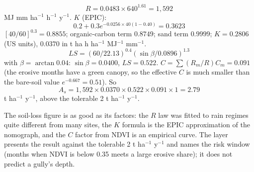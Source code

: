 \sol {}\ans \[R=0.0483\times640^{1.61}=1{,}592\] MJ mm ha$^{-1}$ h$^{-1}$ y$^{-1}$. $K$ (EPIC): \[0.2+0.3e^{-0.0256\times40(1-0.40)}=0.3623\]
$[40/60]^{0.3}=0.8855$; organic-carbon term $0.8749$; sand term $0.9999$; $K=0.2806$ (US units), $0.0370$ in t ha h ha$^{-1}$ MJ$^{-1}$ mm$^{-1}$. \[LS=(60/22.13)^{0.4}(\sin\beta/0.0896)^{1.3}\] with $\beta=\arctan0.04$: $\sin\beta=0.0400$, $LS=0.522$. $C=\sum(R_m/R)C_m=0.091$ (the erosive months have a green canopy, so the effective $C$ is much smaller than the bare-soil value $e^{-0.667}=0.51$). So \[A_s=1{,}592\times0.0370\times0.522\times0.091\times1=2.79\] t ha$^{-1}$ y$^{-1}$, above the tolerable 2 t ha$^{-1}$ y$^{-1}$. \finans


\begin{keybox}The soil-loss figure is as good as its factors: the $R$ law was fitted to rain regimes quite different from many sites, the $K$ formula is the EPIC approximation of the nomograph, and the $C$ factor from NDVI is an empirical curve. The layer presents the result against the tolerable 2 t ha$^{-1}$ y$^{-1}$ and names the risk window (months when NDVI is below 0.35 meets a large erosive share); it does not predict a gully's depth.\end{keybox}

